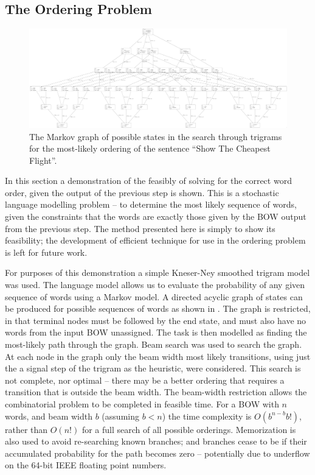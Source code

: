 \documentclass[11pt]{article}
\theoremstyle{plain}
\theoremstyle{definition}
\begin{document}
\subsection{The Ordering Problem} \label{ordering}
\begin{figure}
	\centering 
	\includegraphics[scale=0.15]{markov_reordering2}
	\caption{The Markov graph of possible states in the search through trigrams for the most-likely ordering of the sentence 
		``Show The Cheapest Flight''.}
	\label{markov_diagram}
\end{figure}

In this section a demonstration of the feasibly of solving for the correct word order, given the output of the previous step is shown. This is a stochastic language modelling problem -- to determine the most likely sequence of words, given the constraints that the words are exactly those given by the BOW output from the previous step. The method presented here is simply to show its feasibility; the development of efficient technique for use in the ordering problem is left for future work.

For purposes of this demonstration a simple Kneser-Ney smoothed trigram model \parencite{kneser1995improved} was used. The language model allows us to evaluate the probability of any given sequence of words using a Markov model.
A directed acyclic graph of states can be produced for possible sequences of words as shown in . The graph is restricted, in that terminal nodes must be followed by the end state, and must also have no words from the input BOW unassigned. The task is then modelled as finding the most-likely path through the graph.
Beam search was used to search the graph. At each node in the graph only the beam width most likely transitions, using just the a signal step of the trigram as the heuristic, were considered. This search is not complete, nor optimal -- there may be a better ordering that requires a transition that is outside the beam width. The beam-width restriction allows the combinatorial problem to be completed in feasible time. For a BOW with $n$ words, and beam width $b$ (assuming $b<n$) the time complexity is $O(b^{n-b}b!)$, rather than $O(n!)$ for a full search of all possible orderings. Memorization is also used to avoid re-searching known branches; and branches cease to be  if their accumulated probability for the path becomes zero -- potentially due to underflow on the 64-bit IEEE floating point numbers.
\end{document}
